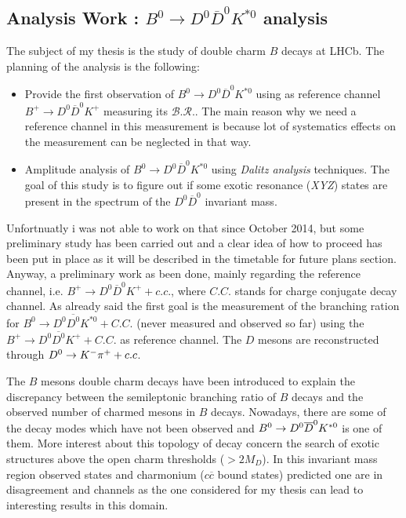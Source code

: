 \documentclass[paper=a4, fontsize=10pt]{scrartcl}
\numberwithin{equation}{section}		%
\numberwithin{figure}{section}			%
\numberwithin{table}{section}				%
\begin{document}
\subsection{Analysis Work : $B^{0}\rightarrow D^{0}\overline{D}^{0}K^{\ast 0}$ analysis}
The subject of my thesis is the study of double charm $B$ decays at LHCb. The planning of the analysis is the following: 
\begin{itemize}
  \item{Provide the first observation of $B^{0}\rightarrow D^{0} \overline{D}^{0} K^{\ast 0}$ using as reference channel $B^{+}\rightarrow D^{0}\overline{D}^{0}K^{+}$ measuring its $\mathcal{B.R.}$.
The main reason why we need a reference channel in this measurement is because lot of systematics effects on the measurement can be neglected in that way.}
\item{Amplitude analysis of $B^{0}\rightarrow D^{0} \overline{D}^{0} K^{\ast 0}$ using \textit{Dalitz analysis} techniques. The goal of this study is to figure out if some exotic resonance (\textit{XYZ}) states are present in the spectrum of the $D^{0}\overline{D}^{0}$ invariant mass.}
\end{itemize}
Unfortnuatly i was not able to work on that since October 2014, but some preliminary study has been carried out and a clear idea of how to proceed has been put in place as it will be described in the timetable for future plans section. Anyway, a preliminary work as been done, mainly regarding the reference channel, i.e. $B^{+}\rightarrow D^{0}\overline{D}^{0}K^{+} +c.c.$, where $C.C.$ stands for charge conjugate decay channel.
As already said the first goal is the measurement of the branching ration for ${ B }^{ 0 }\rightarrow { D }^{ 0 }\overline { { D }^{ 0 } } { K }^{ *0 } + C.C.$ (never measured and observed so far) using the ${ B }^{ + }\rightarrow { D }^{ 0 }\overline { { D }^{ 0 } } { K }^{ + } +C.C.$ as reference channel. The $D$ mesons are reconstructed through $D^{0} \rightarrow K^{-} \pi^{+} +c.c$.

The $B$ mesons double charm decays have been introduced to explain the discrepancy between the semileptonic branching ratio of $B$ decays and the observed number of charmed mesons in $B$ decays. Nowadays, there are some of the decay modes which have not been observed and $B^{0} \rightarrow D^0 \overline{D}^{0} K^{\ast 0}$ is one of them.
More interest about this topology of decay concern the search of exotic structures above the open charm thresholds ($>2M_{D}$). In this invariant mass region observed states and charmonium ($c\overline{c}$ bound states) predicted one are in disagreement and channels as the one considered for my thesis can lead to interesting results in this domain.
\end{document}
